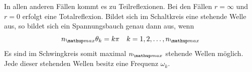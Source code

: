 In allen anderen Fällen kommt es zu Teilreflexionen.
Bei den Fällen $r=\infty$ und $r=0$ erfolgt eine Totalreflexion.
Bildet sich im Schaltkreis eine stehende Welle aus, so bildet sich ein Spannungsbauch
genau dann aus, wenn %
\begin{equation}
\label{eq:spannungsbauch}
n\ua{max}\theta_k=k\pi \quad k=1,2,\dots,n\ua{max}
\end{equation}
Es sind im Schwingkreis somit maximal $n\ua{max}$ stehende Wellen möglich. %
Jede dieser stehenden Wellen besitz eine Frequenz $\omega_k$. %
